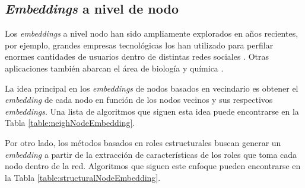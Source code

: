 \subsection{\textit{Embeddings} a nivel de nodo}
Los \textit{embeddings} a nivel nodo han sido ampliamente explorados en años recientes, por ejemplo, grandes empresas tecnológicas los han utilizado para perfilar enormes cantidades de usuarios dentro de distintas redes sociales \cite{lerer_pytorch-biggraph_2019}. Otras aplicaciones también abarcan el área de biología y química \cite{yue_graph_2020}.

La idea principal en los \textit{embeddings} de nodos basados en vecindario es obtener el \textit{embedding} de cada nodo en función de los nodos vecinos y sus respectivos \textit{embeddings}. Una lista de algoritmos que siguen esta idea puede encontrarse en la Tabla \ref{table:neighNodeEmbedding}.

Por otro lado, los métodos basados en roles estructurales buscan generar un \textit{embedding} a partir de la extracción de características de los roles que toma cada nodo dentro de la red. Algoritmos que siguen este enfoque pueden encontrarse en la Tabla \ref{table:structuralNodeEmbedding}. 

